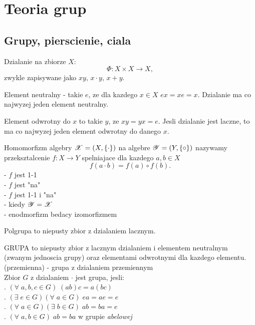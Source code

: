 \section{Teoria grup}

\subsection{Grupy, pierscienie, ciala}
\begin{multicols}{2}

    Dzialanie na zbiorze $X$:
    $$\Phi: X\times X\to X,$$
    zwykle zapisywane jako $xy$, $x\cdot y$, $x+y$.\smallskip

    {\color{def}Element neutralny} - takie $e$, ze dla kazdego $x\in X$ $ex=xe=x$. Dzialanie ma co najwyzej jeden element neutralny.\smallskip
    
    {\color{def}Element odwrotny} do $x$ to takie $y$, ze $xy=yx=e$. Jesli dzialanie jest laczne, to ma co najwyzej jeden element odwrotny do danego $x$.\medskip

    \medskip

    {\color{def}Homomorfizm} algebry $\mathcal{X}=(X,\{ \cdot\})$ na algebre $\mathcal{Y}=(Y,\{\circ\})$ nazywamy przeksztalcenie $f:X\to Y$ spelniajace dla kazdego $a, b\in X$
    $$f(a\cdot b)=f(a)\circ f(b).$$
     - $f$ jest 1-1\smallskip\\
     - $f$ jest "na"\smallskip\\
     - $f$ jest 1-1 i "na"\smallskip\\
     - kiedy $\mathcal{Y}=\mathcal{X}$\smallskip\\
     - enodmorfizm bedacy izomorfizmem\medskip

    \medskip

    {\color{def}Polgrupa} to niepusty zbior z dzialaniem lacznym.\medskip
    
    {\color{def}GRUPA} to niepusty zbior z lacznym dzialaniem i elementem neutralnym (zwanym {\color{acc}jednoscia grupy}) oraz elementami odwrotnymi dla kazdego elementu.\smallskip\\
     (przemienna) - grupa z dzialaniem przemiennym\smallskip\\
    Zbior $G$ z dzialaniem $\cdot$ jest grupa, jesli:\smallskip\\
    . $(\forall\;a,b,c\in G)\;(ab)c=a(bc)$\\
    . $(\exists\;e\in G)(\forall\;a\in G)\;ea=ae=e$\\
    . $(\forall\;a\in G)(\exists\;b\in G)\;ab=ba=e$\\
    . $(\forall\;a,b\in G)\;ab=ba$ w grupie \emph{abelowej}\bigskip


\end{multicols}
